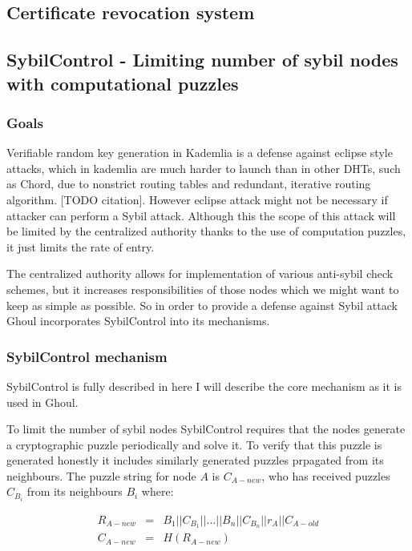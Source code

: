 \subsection{Certificate revocation system}

\subsection{SybilControl - Limiting number of sybil nodes with computational
puzzles}
\subsubsection{Goals}
  Verifiable random key generation in Kademlia is a defense against eclipse
  style attacks, which in kademlia are much harder to launch than in other
  DHTs, such as Chord, due to nonstrict routing tables and redundant, iterative
  routing algorithm. [TODO citation]. However eclipse attack might not be
  necessary if attacker can perform a Sybil attack. Although this the scope of
  this attack will be limited by the centralized authority thanks to the use of
  computation puzzles, it just limits the rate of entry.

  The centralized authority allows for implementation of various anti-sybil
  check schemes, but it increases responsibilities of those nodes which we might
  want to keep as simple as possible. So in order to provide a defense against
  Sybil attack Ghoul incorporates SybilControl into its mechanisms.

\subsubsection{SybilControl mechanism}
  SybilControl is fully described in \cite{li12} here I will describe the core
  mechanism as it is used in Ghoul. 

  To limit the number of sybil nodes SybilControl requires that the nodes
  generate a cryptographic puzzle periodically and solve it. To verify that this
  puzzle is generated honestly it includes similarly generated puzzles prpagated
  from its neighbours. The puzzle string for node $A$ is $C_{A-new}$, who has
  received puzzles $C_{B_i}$ from its neighbours $B_{i}$ where:

  \begin{eqnarray*}
      R_{A-new} &=& B_1||C_{B_1}||\ldots||B_n||C_{B_n}||r_A||C_{A-old}\\
    C_{A-new} &=& H\left(R_{A-new}\right)
  \end{eqnarray*}

